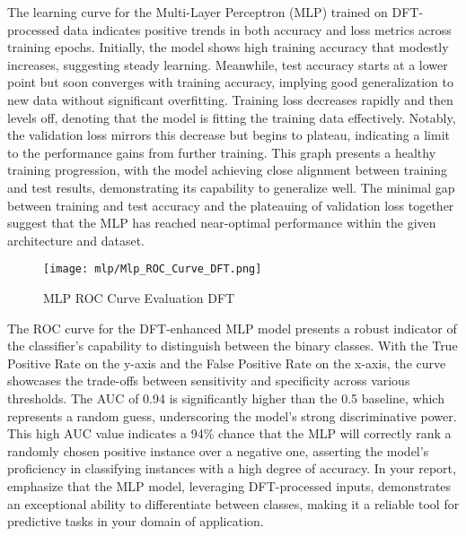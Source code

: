 The learning curve for the Multi-Layer Perceptron (MLP) trained on DFT-processed data indicates positive trends in both accuracy and loss metrics across training epochs. Initially, the model shows high training accuracy that modestly increases, suggesting steady learning. Meanwhile, test accuracy starts at a lower point but soon converges with training accuracy, implying good generalization to new data without significant overfitting. Training loss decreases rapidly and then levels off, denoting that the model is fitting the training data effectively. Notably, the validation loss mirrors this decrease but begins to plateau, indicating a limit to the performance gains from further training. This graph presents a healthy training progression, with the model achieving close alignment between training and test results, demonstrating its capability to generalize well. The minimal gap between training and test accuracy and the plateauing of validation loss together suggest that the MLP has reached near-optimal performance within the given architecture and dataset.

\begin{figure}[H] 
  \centering
  \texttt{[image: mlp/Mlp\_ROC\_Curve\_DFT.png]}
  \caption{MLP ROC Curve Evaluation DFT}\label{fig:Mlp_ROC_Curve_DFT}
\end{figure}

The ROC curve for the DFT-enhanced MLP model presents a robust indicator of the classifier's capability to distinguish between the binary classes. With the True Positive Rate on the y-axis and the False Positive Rate on the x-axis, the curve showcases the trade-offs between sensitivity and specificity across various thresholds. The AUC of 0.94 is significantly higher than the 0.5 baseline, which represents a random guess, underscoring the model's strong discriminative power. This high AUC value indicates a 94\% chance that the MLP will correctly rank a randomly chosen positive instance over a negative one, asserting the model's proficiency in classifying instances with a high degree of accuracy. In your report, emphasize that the MLP model, leveraging DFT-processed inputs, demonstrates an exceptional ability to differentiate between classes, making it a reliable tool for predictive tasks in your domain of application.

